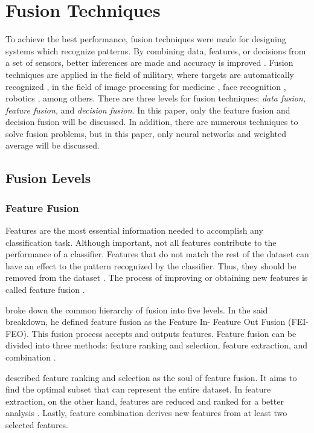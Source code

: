 \section{Fusion Techniques}
To achieve the best performance, fusion techniques were made for designing systems which recognize patterns. By combining data, features, or decisions from a set of sensors, better inferences are made and accuracy is improved . Fusion techniques are applied in the field of military, where targets are automatically recognized , in the field of image processing for medicine , face recognition , robotics , among others. There are three levels for fusion techniques: \textit{data fusion, feature fusion, } and \textit{decision fusion}. In this paper, only the feature fusion and decision fusion will be discussed. In addition, there are numerous techniques to solve fusion problems, but in this paper, only neural networks and weighted average will be discussed.

\subsection{Fusion Levels}
\subsubsection{Feature Fusion}
Features are the most essential information needed to accomplish any classification task. Although important, not all features contribute to the performance of a classifier. Features that do not match the rest of the dataset can have an effect to the pattern recognized by the classifier. Thus, they should be removed from the dataset . The process of improving or obtaining new features is called feature fusion . 

 broke down the common hierarchy of fusion into five levels. In the said breakdown, he defined feature fusion as the Feature In- Feature Out Fusion (FEI-FEO). This fusion process accepts and outputs features. Feature fusion can be divided into three methods:  feature ranking and selection, feature extraction, and combination .

 described feature ranking and selection as the soul of feature fusion. It aims to find the optimal subset that can represent the entire dataset. In feature extraction, on the other hand, features are reduced and ranked for a better analysis . Lastly, feature combination derives new features from at least two selected features.

